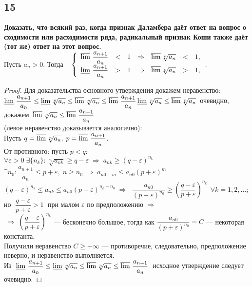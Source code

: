 \documentclass[a4paper, fleqn]{article}
\begin{document}
    \subsection*{15}
        \textbf{ Доказать, что всякий раз, когда признак Даламбера даёт ответ на вопрос о сходимости или расходимости ряда, 
	радикальный признак Коши также даёт (тот же) ответ на этот вопрос.} \\[5 pt]
	Пусть $a_n > 0$. Тогда 
	$\;\;\; \left\{\begin{array}{lllllll}
	\varlimsup \, \dfrac{a_{n+1}}{a_n} & < & 1 & \Rightarrow & \varlimsup \sqrt[n]{a_n} & < & 1,\\[5 pt]
	\varliminf \, \dfrac{a_{n+1}}{a_n} & > & 1 & \Rightarrow & \varlimsup \sqrt[n]{a_n} & > & 1,\\[5 pt]
	\end{array}\right.$. \\
	\begin{proof}
	Для доказательства основного утверждения докажем неравенство: \\[3 pt]
	$\varliminf \, \dfrac{a_{n+1}}{a_n} \le \varliminf \sqrt[n]{a_n} \le \varlimsup \sqrt[n]{a_n} \le \varlimsup \, \dfrac{a_{n+1}}{a_n} \\[3 pt]
	\varliminf \sqrt[n]{a_n} \le \varlimsup \sqrt[n]{a_n} \,$ очевидно, докажем 
	$\, \varlimsup \sqrt[n]{a_n} \le \varlimsup \, \dfrac{a_{n+1}}{a_n}$ \\[3 pt]
	(левое неравенство доказывается аналогично): \\[3 pt]
	Пусть $q = \varlimsup \sqrt[n]{a_n}, \; p = \varlimsup \, \dfrac{a_{n+1}}{a_n}$. \\[3 pt]
	От противного: пусть $p < q$:\\[3 pt]
	$\forall \varepsilon > 0 \; \exists \{ n_k \} : \sqrt[n_k]{a_{nk}} \ge q - \varepsilon \; \Rightarrow \; a_{nk} \ge (q - \varepsilon)^{n_k}$ \\[3 pt]
	$\exists n_0 : \dfrac{a_{n+1}}{a_n} \le p + \varepsilon, \; n \ge n_0 \; \Rightarrow \; a_{n0 + m} \le a_{n0} (p + \varepsilon)^m$ \\[3 pt]
	$(q - \varepsilon)^{n_k} \le a_{nk} \le a_{n0} (p + \varepsilon)^{n_k - n_0} \; \Rightarrow \; $
	$\dfrac{a_{n0}}{(p + \varepsilon)^{n_0}} \ge \left( \dfrac{q - \varepsilon}{p + \varepsilon} \right)^{n_k} \;\, \forall k = 1, 2, \dots;$ \\[3 pt]
	но $\; \dfrac{q - \varepsilon}{p + \varepsilon} > 1 \; $ при малом $\varepsilon$ по предположению $\Rightarrow$ \\[3 pt]
	$\; \Rightarrow \; \left( \dfrac{q - \varepsilon}{p + \varepsilon} \right)^{n_k}$ --- бесконечно большое, тогда как
	$\dfrac{a_{n0}}{(p + \varepsilon)^{n_0}} = C$ --- некоторая константа. \\[3 pt]
	Получили неравенство $C \ge +\infty$ --- противоречие, следовательно, предположение неверно, и неравенство выполняется. \\[3 pt]
	Из $\; \varliminf \, \dfrac{a_{n+1}}{a_n} \le \varliminf \sqrt[n]{a_n} \le \varlimsup \sqrt[n]{a_n} \le \varlimsup \, \dfrac{a_{n+1}}{a_n}\; $ 
        исходное утверждение следует очевидно.
	\end{proof}    
        
\end{document}
